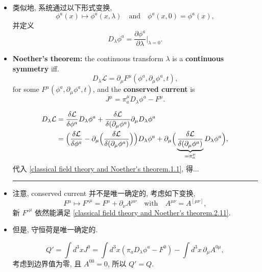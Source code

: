 \begin{itemize}
	\item 类似地, 系统通过以下形式变换,
	\begin{equation}
		\phi^a(x) \mapsto \phi^a(x, \lambda) \quad \text{and} \quad \phi^a(x, 0) = \phi^a(x),
	\end{equation}
	并定义
	\begin{equation}
		D_\lambda \phi^a = \frac{\partial \phi^a}{\partial \lambda} \Big|_{\lambda = 0}.
	\end{equation}
	
	\item \textbf{Noether's theorem:} the continuous transform $\lambda$ is a \textbf{continuous symmetry} iff.
	\begin{equation} \label{classical field theory and Noether's theorem.2.11}
		D_\lambda \mathcal{L} = \partial_\mu F^\mu(\phi^a, \partial_\mu \phi^a, t),
	\end{equation}
	for some $F^\mu(\phi^a, \partial_\mu \phi^a, t)$, and the \textbf{conserved current} is
	\begin{equation} \label{classical field theory and Noether's theorem.2.12}
		J^\mu = \pi_a^\mu D_\lambda \phi^a - F^\mu.
	\end{equation}
	
	\begin{tcolorbox}[title=proof:]
		\begin{align}
			D_\lambda \mathcal{L} &= \frac{\delta \mathcal{L}}{\delta \phi^a} D_\lambda \phi^a + \frac{\delta \mathcal{L}}{\delta (\partial_\mu \phi^a)} \partial_\mu D_\lambda \phi^a \notag \\
			&= \Big( \frac{\delta \mathcal{L}}{\delta \phi^a} - \partial_\mu \Big( \frac{\delta \mathcal{L}}{\delta (\partial_\mu \phi^a)} \Big) \Big) D_\lambda \phi^a + \partial_\mu \Big( \underbrace{\frac{\delta \mathcal{L}}{\delta (\partial_\mu \phi^a)}}_{= \pi_a^\mu} D_\lambda \phi^a \Big),
		\end{align}
		代入 \eqref{classical field theory and Noether's theorem.1.1}, 得...
	\end{tcolorbox}
	
	\noindent\rule[0.5ex]{\linewidth}{0.5pt} %
	
	\item 注意, conserved current 并不是唯一确定的, 考虑如下变换,
	\begin{equation}
		F^\mu \mapsto F'^\mu = F^\mu + \partial_\nu A^{\mu \nu} \quad \text{with} \quad A^{\mu \nu} = A^{[\mu \nu]},
	\end{equation}
	新 $F'^\mu$ 依然能满足 \eqref{classical field theory and Noether's theorem.2.11}.
	
	\item 但是, 守恒荷是唯一确定的.
	
	\begin{tcolorbox}[title=proof:]
		\begin{equation}
			Q' = \int d^3 x J^0 = \int d^3 x (\pi_a D_\lambda \phi^a - F^0) - \int d^3 x \, \partial_\mu A^{0 \mu},
		\end{equation}
		考虑到边界值为零, 且 $A^{0 0} = 0$, 所以 $Q' = Q$.
	\end{tcolorbox}
\end{itemize}

